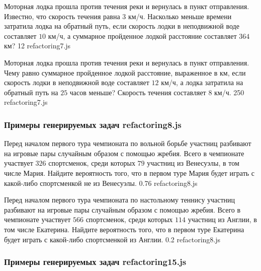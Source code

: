 \par{Моторная лодка прошла против течения реки и вернулась в пункт отправления. Известно, что скорость течения равна $3$ км/ч. Насколько меньше времени затратила лодка на обратный путь, если скорость лодки в неподвижной воде составляет $10$ км/ч, а суммарное пройденное лодкой расстояние составляет $364$ км? }{ 12 }{refactoring7.js}
\par{Моторная лодка прошла против течения реки и вернулась в пункт отправления. Чему равно суммарное пройденное лодкой расстояние, выраженное в км, если скорость лодки в неподвижной воде составляет $12$ км/ч, а лодка затратила на обратный путь на $25$ часов меньше? Скорость течения составляет $8$ км/ч. }{ 250 }{refactoring7.js}


\subsubsection*{Примеры генерируемых задач refactoring8.js}
 
\par{Перед началом первого тура чемпионата по вольной борьбе участниц разбивают на игровые пары случайным образом с помощью жребия. Всего в чемпионате участвует $326$ спортсменок, среди которых $79$ участниц из Венесуэлы, в том числе Мария. Найдите вероятность того, что в первом туре Мария будет играть с какой-либо спортсменкой не из Венесуэлы. }{ 0.76 }{refactoring8.js}
\par{Перед началом первого тура чемпионата по настольному теннису участниц разбивают на игровые пары случайным образом с помощью жребия. Всего в чемпионате участвует $566$ спортсменок, среди которых $114$ участниц из Англии, в том числе Екатерина. Найдите вероятность того, что в первом туре Екатерина будет играть с какой-либо спортсменкой из Англии. }{ 0.2 }{refactoring8.js}


\subsubsection*{Примеры генерируемых задач refactoring15.js}
 
